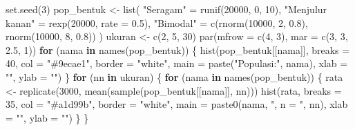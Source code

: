 \documentclass[
  indonesian,
  letterpaper,
]{book}
\newenvironment{Shaded}{\begin{snugshade}}{\end{snugshade}}
\newcommand{\AttributeTok}[1]{\textcolor[rgb]{0.40,0.45,0.13}{#1}}
\newcommand{\ControlFlowTok}[1]{\textcolor[rgb]{0.00,0.23,0.31}{\textbf{#1}}}
\newcommand{\DecValTok}[1]{\textcolor[rgb]{0.68,0.00,0.00}{#1}}
\newcommand{\FloatTok}[1]{\textcolor[rgb]{0.68,0.00,0.00}{#1}}
\newcommand{\FunctionTok}[1]{\textcolor[rgb]{0.28,0.35,0.67}{#1}}
\newcommand{\NormalTok}[1]{\textcolor[rgb]{0.00,0.23,0.31}{#1}}
\newcommand{\OtherTok}[1]{\textcolor[rgb]{0.00,0.23,0.31}{#1}}
\newcommand{\StringTok}[1]{\textcolor[rgb]{0.13,0.47,0.30}{#1}}
\begin{document}
\begin{Shaded}
\begin{Highlighting}[]
\FunctionTok{set.seed}\NormalTok{(}\DecValTok{3}\NormalTok{)}
\NormalTok{pop\_bentuk }\OtherTok{\textless{}{-}} \FunctionTok{list}\NormalTok{(}
\StringTok{"Seragam"} \OtherTok{=} \FunctionTok{runif}\NormalTok{(}\DecValTok{20000}\NormalTok{, }\DecValTok{0}\NormalTok{, }\DecValTok{10}\NormalTok{),}
\StringTok{"Menjulur kanan"} \OtherTok{=} \FunctionTok{rexp}\NormalTok{(}\DecValTok{20000}\NormalTok{, }\AttributeTok{rate =} \FloatTok{0.5}\NormalTok{),}
\StringTok{"Bimodal"} \OtherTok{=} \FunctionTok{c}\NormalTok{(}\FunctionTok{rnorm}\NormalTok{(}\DecValTok{10000}\NormalTok{, }\DecValTok{2}\NormalTok{, }\FloatTok{0.8}\NormalTok{), }\FunctionTok{rnorm}\NormalTok{(}\DecValTok{10000}\NormalTok{, }\DecValTok{8}\NormalTok{, }\FloatTok{0.8}\NormalTok{))}
\NormalTok{)}
\NormalTok{ukuran }\OtherTok{\textless{}{-}} \FunctionTok{c}\NormalTok{(}\DecValTok{2}\NormalTok{, }\DecValTok{5}\NormalTok{, }\DecValTok{30}\NormalTok{)}
\FunctionTok{par}\NormalTok{(}\AttributeTok{mfrow =} \FunctionTok{c}\NormalTok{(}\DecValTok{4}\NormalTok{, }\DecValTok{3}\NormalTok{), }\AttributeTok{mar =} \FunctionTok{c}\NormalTok{(}\DecValTok{3}\NormalTok{, }\DecValTok{3}\NormalTok{, }\FloatTok{2.5}\NormalTok{, }\DecValTok{1}\NormalTok{))}
\ControlFlowTok{for}\NormalTok{ (nama }\ControlFlowTok{in} \FunctionTok{names}\NormalTok{(pop\_bentuk)) \{}
\FunctionTok{hist}\NormalTok{(pop\_bentuk[[nama]], }\AttributeTok{breaks =} \DecValTok{40}\NormalTok{, }\AttributeTok{col =} \StringTok{"\#9ecae1"}\NormalTok{, }\AttributeTok{border =} \StringTok{"white"}\NormalTok{,}
\AttributeTok{main =} \FunctionTok{paste}\NormalTok{(}\StringTok{"Populasi:"}\NormalTok{, nama), }\AttributeTok{xlab =} \StringTok{""}\NormalTok{, }\AttributeTok{ylab =} \StringTok{""}\NormalTok{)}
\NormalTok{\}}
\ControlFlowTok{for}\NormalTok{ (nn }\ControlFlowTok{in}\NormalTok{ ukuran) \{}
\ControlFlowTok{for}\NormalTok{ (nama }\ControlFlowTok{in} \FunctionTok{names}\NormalTok{(pop\_bentuk)) \{}
\NormalTok{rata }\OtherTok{\textless{}{-}} \FunctionTok{replicate}\NormalTok{(}\DecValTok{3000}\NormalTok{, }\FunctionTok{mean}\NormalTok{(}\FunctionTok{sample}\NormalTok{(pop\_bentuk[[nama]], nn)))}
\FunctionTok{hist}\NormalTok{(rata, }\AttributeTok{breaks =} \DecValTok{35}\NormalTok{, }\AttributeTok{col =} \StringTok{"\#a1d99b"}\NormalTok{, }\AttributeTok{border =} \StringTok{"white"}\NormalTok{,}
\AttributeTok{main =} \FunctionTok{paste0}\NormalTok{(nama, }\StringTok{", n = "}\NormalTok{, nn), }\AttributeTok{xlab =} \StringTok{""}\NormalTok{, }\AttributeTok{ylab =} \StringTok{""}\NormalTok{)}
\NormalTok{\}}
\NormalTok{\}}
\end{Highlighting}
\end{Shaded}
\end{document}
